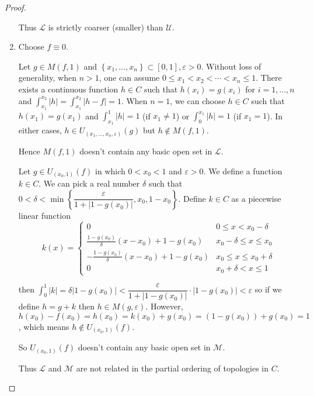 \begin{proof}
\begin{enumerate}[label={(\alph*)}]
              Thus \( \mathscr{L} \) is strictly coarser (smaller) than \( \mathscr{U} \).
        \item Choose \( f \equiv 0 \).

              Let \( g \in M(f, 1) \) and \( \left\{ x_{1}, \ldots, x_{n} \right\} \subset [0, 1], \varepsilon > 0 \). Without loss of generality, when \( n > 1 \), one can assume \( 0 \le x_{1} < x_{2} < \cdots < x_{n} \le 1 \). There exists a continuous function \( h \in C \) such that \( h(x_{i}) = g(x_{i}) \) for \( i = 1, \ldots, n \) and \( \int_{x_{1}}^{x_{2}}\left\vert h \right\vert = \int_{x_{1}}^{x_{2}}\left\vert h - f \right\vert = 1 \). When \( n = 1 \), we can choose \( h \in C \) such that \( h(x_{1}) = g(x_{1}) \) and \( \int_{x_{1}}^{1}\left\vert h \right\vert = 1 \) (if \( x_{1} \ne 1 \)) or \( \int_{0}^{x_{1}}\left\vert h \right\vert = 1 \) (if \( x_{1} = 1 \)). In either cases, \( h \in U_{(x_{1}, \ldots, x_{n}, \varepsilon)}(g) \) but \( h \notin M(f, 1) \).

              Hence \( M(f, 1) \) doesn't contain any basic open set in \( \mathscr{L} \).

              Let \( g \in U_{(x_{0}, 1)}(f) \) in which \( 0 < x_{0} < 1 \) and \( \varepsilon > 0 \). We define a function \( k \in C \). We can pick a real number \( \delta \) such that \( 0 < \delta < \min\left\{ \dfrac{\varepsilon}{1 + \left\vert 1 - g(x_{0}) \right\vert}, x_{0}, 1 - x_{0} \right\} \). Define \( k \in C \) as a piecewise linear function
              \[
                  k(x) = \begin{cases}
                      0                                                      & 0 \le x < x_{0} - \delta       \\
                      \frac{1 - g(x_{0})}{\delta}(x - x_{0}) + 1 - g(x_{0})  & x_{0} - \delta \le x \le x_{0} \\
                      -\frac{1 - g(x_{0})}{\delta}(x - x_{0}) + 1 - g(x_{0}) & x_{0} \le x \le x_{0} + \delta \\
                      0                                                      & x_{0} + \delta < x \le 1
                  \end{cases}
              \]

              then \( \int_{0}^{1}\left\vert k \right\vert = \delta\left\vert 1 - g(x_{0}) \right\vert < \dfrac{\varepsilon}{1 + \left\vert 1 - g(x_{0})\right\vert} \cdot \left\vert 1 - g(x_{0}) \right\vert < \varepsilon \) so if we define \( h = g + k \) then \( h \in M(g, \varepsilon) \). However, \( h(x_{0}) - f(x_{0}) = h(x_{0}) = k(x_{0}) + g(x_{0}) = (1 - g(x_{0})) + g(x_{0}) = 1 \), which means \( h \notin U_{(x_{0}, 1)}(f) \).

              So \( U_{(x_{0}, 1)}(f) \) doesn't contain any basic open set in \( \mathscr{M} \).

              Thus \( \mathscr{L} \) and \( \mathscr{M} \) are not related in the partial ordering of topologies in \( C \).
    \end{enumerate}
\end{proof}

